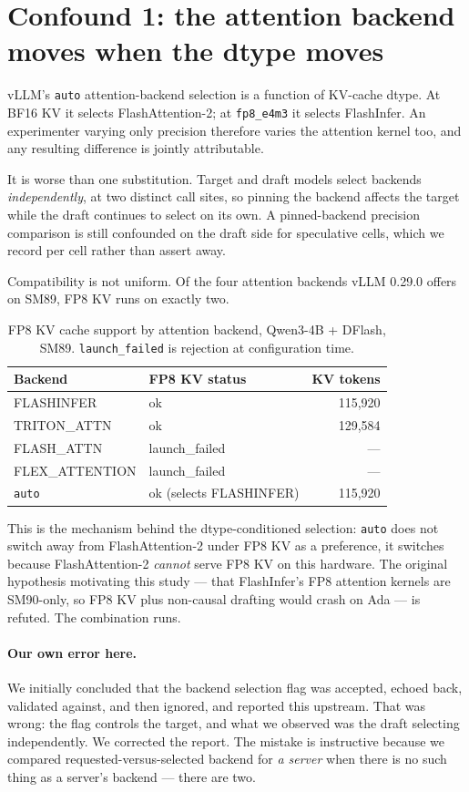 \documentclass[11pt]{article}
\newcommand{\tw}[1]{\texttt{\small #1}}
\begin{document}
\section{Confound 1: the attention backend moves when the dtype moves}\label{sec:c1}

vLLM's \tw{auto} attention-backend selection is a function of KV-cache
dtype. At BF16 KV it selects FlashAttention-2; at \tw{fp8\_e4m3} it selects
FlashInfer. An experimenter varying only precision therefore varies the
attention kernel too, and any resulting difference is jointly attributable.

It is worse than one substitution. Target and draft models select backends
\emph{independently}, at two distinct call sites, so pinning the backend
affects the target while the draft continues to select on its own. A
pinned-backend precision comparison is still confounded on the draft side
for speculative cells, which we record per cell rather than assert away.

Compatibility is not uniform. Of the four attention backends vLLM 0.29.0
offers on SM89, FP8 KV runs on exactly two.

\begin{table}[h]\centering\small
\caption{FP8 KV cache support by attention backend, Qwen3-4B + DFlash, SM89.
\tw{launch\_failed} is rejection at configuration time.}
\begin{tabular}{llr}
\toprule
Backend & FP8 KV status & KV tokens\\
\midrule
FLASHINFER & ok & 115{,}920\\
TRITON\_ATTN & ok & 129{,}584\\
FLASH\_ATTN & launch\_failed & ---\\
FLEX\_ATTENTION & launch\_failed & ---\\
\tw{auto} & ok (selects FLASHINFER) & 115{,}920\\
\bottomrule
\end{tabular}
\end{table}

\noindent
This is the mechanism behind the dtype-conditioned selection: \tw{auto} does
not switch away from FlashAttention-2 under FP8 KV as a preference, it
switches because FlashAttention-2 \emph{cannot} serve FP8 KV on this
hardware. The original hypothesis motivating this study --- that FlashInfer's
FP8 attention kernels are SM90-only, so FP8 KV plus non-causal drafting
would crash on Ada --- is refuted. The combination runs.

\paragraph{Our own error here.} We initially concluded that the backend
selection flag was accepted, echoed back, validated against, and then
ignored, and reported this upstream. That was wrong: the flag controls the
target, and what we observed was the draft selecting independently. We
corrected the report. The mistake is instructive because we compared
requested-versus-selected backend for \emph{a server} when there is no such
thing as a server's backend --- there are two.
\end{document}
